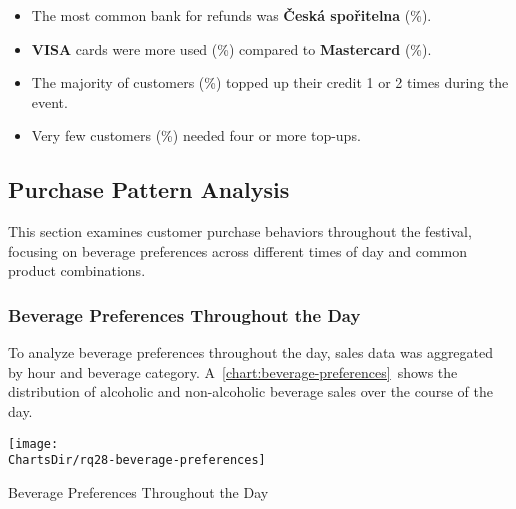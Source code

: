 \begin{keytakeaways}
	\begin{itemize}
		\item The most common bank for refunds was \textbf{Česká spořitelna} (\%).
		\item \textbf{VISA} cards were more used (\%) compared to \textbf{Mastercard} (\%).
		\item The majority of customers (\%) topped up their credit 1 or 2 times during the event.
		\item Very few customers (\%) needed four or more top-ups.
	\end{itemize}
\end{keytakeaways}


\subsection{Purchase Pattern Analysis}
\label{subsec:analysis-customer-purchase-pattern}

This section examines customer purchase behaviors throughout the festival, focusing on beverage preferences across different times of day and common product combinations.


\subsubsection{Beverage Preferences Throughout the Day}
\label{subsubsec:analysis-beverage-preferences}


To analyze beverage preferences throughout the day, sales data was aggregated by hour and beverage category.
A~\autoref{chart:beverage-preferences}~shows the distribution of alcoholic and non-alcoholic beverage sales over the course of the day.

\begin{chart}[h]
	\centering
	\texttt{[image: \\ChartsDir/rq28-beverage-preferences]}
	\caption{ Beverage Preferences Throughout the Day}
	\label{chart:beverage-preferences}
	\source
\end{chart}

